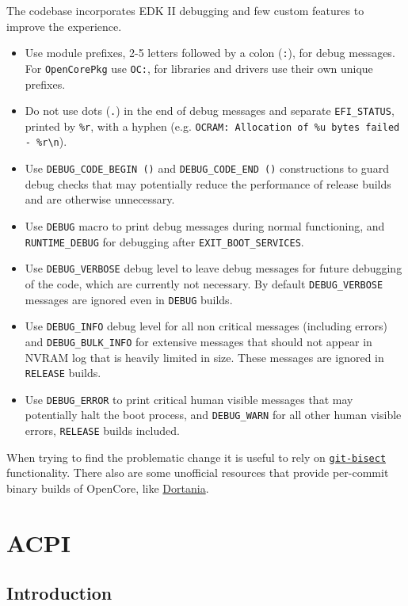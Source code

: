 \documentclass[]{article}
\makeatletter
\providecommand{\tightlist}{%
  \setlength{\itemsep}{0pt}\setlength{\parskip}{0pt}}
\renewcommand{\label}[1]{%
\zref@wrapper@immediate{\oldlabel{#1}}}  %
\makeatother
\begin{document}
The codebase incorporates EDK II debugging and few custom features to improve the experience.
\begin{itemize}
\tightlist
\item Use module prefixes, 2-5 letters followed by a colon (\texttt{:}), for debug messages. For \texttt{OpenCorePkg}
use \texttt{OC:}, for libraries and drivers use their own unique prefixes.
\item Do not use dots (\texttt{.}) in the end of debug messages and separate \texttt{EFI\_STATUS}, printed by
\texttt{\%r}, with a hyphen (e.g. \texttt{OCRAM: Allocation of \%u bytes failed - \%r\textbackslash n}).
\item Use \texttt{DEBUG\_CODE\_BEGIN ()} and \texttt{DEBUG\_CODE\_END ()} constructions to guard debug checks
that may potentially reduce the performance of release builds and are otherwise unnecessary.
\item Use \texttt{DEBUG} macro to print debug messages during normal functioning, and \texttt{RUNTIME\_DEBUG} for
debugging after \texttt{EXIT\_BOOT\_SERVICES}.
\item Use \texttt{DEBUG\_VERBOSE} debug level to leave debug messages for future debugging of the code, which
are currently not necessary. By default \texttt{DEBUG\_VERBOSE} messages are ignored even in \texttt{DEBUG} builds.
\item Use \texttt{DEBUG\_INFO} debug level for all non critical messages (including errors) and \texttt{DEBUG\_BULK\_INFO}
for extensive messages that should not appear in NVRAM log that is heavily limited in size. These messages are ignored in
\texttt{RELEASE} builds.
\item Use \texttt{DEBUG\_ERROR} to print critical human visible messages that may potentially halt the boot process, and
\texttt{DEBUG\_WARN} for all other human visible errors, \texttt{RELEASE} builds included.
\end{itemize}

When trying to find the problematic change it is useful to rely on
\href{https://git-scm.com/docs/git-bisect}{\texttt{git-bisect}} functionality.
There also are some unofficial resources that provide per-commit binary
builds of OpenCore, like \href{https://dortania.github.io/builds}{Dortania}.

\section{ACPI}\label{acpi}

\subsection{Introduction}\label{acpiintro}
\end{document}
